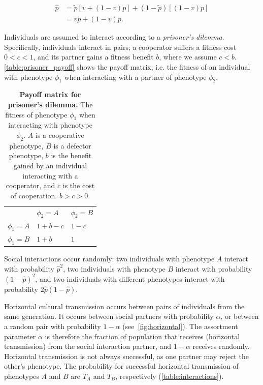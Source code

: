\documentclass[12pt]{extarticle}
\begin{document}
\begin{equation}\label{eq:horizontal}
\begin{aligned}
\hat{p}
& = \tilde{p} [v + (1-v)p] + (1-\tilde{p}) [(1-v)p] \\
& = v \tilde{p} + (1-v) p.
\end{aligned}
\end{equation}

Individuals are assumed to interact according to a \emph{prisoner's dilemma}.
Specifically, individuals interact in pairs; a cooperator suffers a fitness cost $0<c<1$, and its partner gains a fitness benefit $b$, where we assume $c<b$. \autoref{table:prisoner_payoff} shows the payoff matrix, i.e. the fitness of an individual with phenotype $\phi_1$ when interacting with a partner of phenotype $\phi_2$.

\bigskip
\begin{table}[h]
\centering
\begin{tabular}{lll}
\toprule
           & $\phi_2=A$ & $\phi_2=B$ \\ \cmidrule(r){1-3}
$\phi_1=A$ & $1+b-c$ & $1-c$ \\
$\phi_1=B$ & $1+b$   & $1$
\\ \bottomrule
\end{tabular}
\caption{\textbf{Payoff matrix for prisoner's dilemma.}
The fitness of phenotype $\phi_1$ when interacting with phenotype $\phi_2$. $A$ is a cooperative phenotype, $B$ is a defector phenotype, $b$ is the benefit gained by an individual interacting with a cooperator, and $c$ is the cost of cooperation. $b>c>0$.
}
\label{table:prisoner_payoff}
\end{table}
\bigskip


Social interactions occur randomly:
two individuals with phenotype $A$ interact with probability $\hat{p}^2$, two individuals with phenotype $B$ interact with probability $(1-\hat{p})^2$, and two individuals with different phenotypes interact with probability $2\hat{p}(1-\hat{p})$. 

Horizontal cultural transmission occurs between pairs of individuals from the same generation. 
It occurs between social partners with probability $\alpha$, or between a random pair with probability $1-\alpha$ (see~\autoref{fig:horizontal}).
The assortment parameter $\alpha$ is therefore the fraction of population that receives (horizontal transmission) from the social interaction partner, and $1-\alpha$ receives randomly.
Horizontal transmission is not always successful, as one partner may reject the other's phenotype. The probability for successful horizontal transmission of phenotypes $A$ and $B$ are $T_A$ and $T_B$, respectively (\autoref{table:interactions}).
\end{document}
